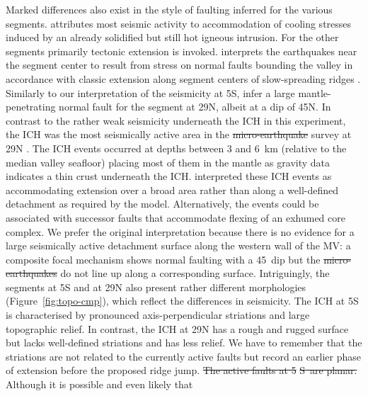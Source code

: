 \documentclass[jgrga]{agu2001} %
\newlength{\tw}
\providecommand{\DIFadd}[1]{{\protect\color{blue}\uwave{#1}}} %
\providecommand{\DIFdel}[1]{{\protect\color{red}\sout{#1}}}                      %
\providecommand{\DIFaddbegin}{} %
\providecommand{\DIFaddend}{} %
\providecommand{\DIFdelbegin}{} %
\providecommand{\DIFdelend}{} %
\begin{document}
\begin{article}
Marked differences also
exist in  the style of faulting inferred for the various segments.
\citet{kong92} attributes most seismic activity to accommodation of
cooling stresses induced by an already solidified but still hot
igneous intrusion. For the other segments primarily tectonic extension
is invoked.  \citet{barclay01} interprets the earthquakes 
 near the
segment center to result from  stress on normal faults bounding the
valley in accordance with classic extension along segment centers of
slow-spreading ridges \citep{mutter92}.   Similarly to our
interpretation of the seismicity at 5\dg S, \citet{toomey88} infer a
large mantle-penetrating 
normal fault for the segment at 29\dg N, albeit
at a dip of 45\dg N.  In contrast to the rather weak seismicity
underneath the ICH in this experiment, the ICH was the most
seismically active area in the \DIFdelbegin \DIFdel{micro-earthquake }\DIFdelend \DIFaddbegin \DIFadd{microearthquake }\DIFaddend survey at 29\dg N
\citep{wolfe95}.  The ICH events occurred at depths between 3
and 6~km (relative to the median valley seafloor) placing most of them
in the mantle as gravity data
indicates a thin crust underneath the ICH.  \citet{wolfe95} interpreted
these ICH events as accommodating extension over a broad area rather
than along a well-defined detachment as required by the
\citet{tucholke94} model. Alternatively, the events could be
associated with successor faults that accommodate flexing of an
exhumed core complex.  We prefer the original interpretation because
there is no evidence for a large seismically active detachment surface
along the western wall of the MV: a composite focal mechanism shows
normal faulting with a 45\dg\ dip but the \DIFdelbegin \DIFdel{micro-earthquakes }\DIFdelend \DIFaddbegin \DIFadd{microearthquakes }\DIFaddend do not
line up along  a corresponding surface.
Intriguingly, the segments at 5\dg S and at 29\dg N also
present rather different morphologies (Figure~\ref{fig:topo-cmp}),
which reflect the differences in seismicity.  The ICH at
5\dg S is characterised by pronounced axis-perpendicular striations
and large topographic relief.  In contrast, the ICH at 29\dg N has a
rough and rugged surface but lacks well-defined striations and has
less relief. We have to remember that the striations \DIFaddbegin \DIFadd{at 5}\dg \DIFadd{S }\DIFaddend are not
related to the currently active faults but record an earlier phase of
extension before the proposed ridge jump.  \DIFdelbegin \DIFdel{The active faults at 5}%
\DIFdel{S\ are planar. }\DIFdelend Although it is possible and even likely that

\end{article}
\end{document}
